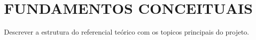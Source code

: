 \chapter{\textbf{FUNDAMENTOS CONCEITUAIS}}
\label{cap-fundamentos-conceituais}

Descrever a estrutura do referencial teórico com os topicos principais do projeto.








